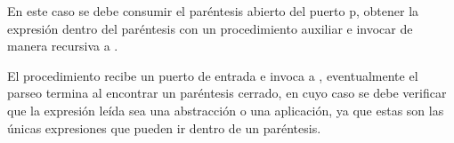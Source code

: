 \documentclass[letterpaper, twoside, openright, 11pt]{book}%
\begin{document}
En este caso se debe consumir el paréntesis abierto del puerto {\Tt{}p\nwendquote}, obtener la expresión dentro del paréntesis con un procedimiento auxiliar {\Tt{}\nwendquote} e invocar de manera recursiva a {\Tt{}\nwendquote}.

El procedimiento {\Tt{}\nwendquote} recibe un puerto de entrada e invoca a {\Tt{}\nwendquote}, eventualmente el parseo termina al encontrar un paréntesis cerrado, en cuyo caso se debe verificar que la expresión leída sea una abstracción o una aplicación, ya que estas son las únicas expresiones que pueden ir dentro de un paréntesis.
\end{document}
